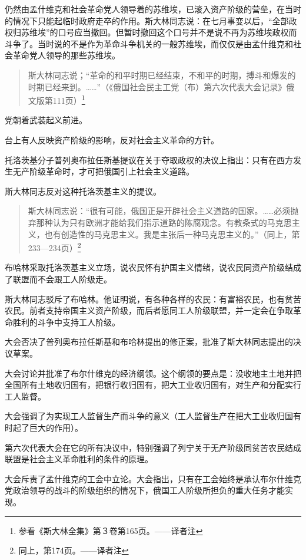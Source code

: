 仍然由孟什维克和社会革命党人领导着的苏维埃，已滚入资产阶级的营垒，在当时的情况下只能起临时政府走卒的作用。斯大林同志说：在七月事变以后，“全部政权归苏维埃”的口号应当撤回。但暂时撤回这个口号并不是说不再为苏维埃政权而斗争了。当时说的不是作为革命斗争机关的一般苏维埃，而仅仅是由孟什维克和社会革命党人领导的那些苏维埃。

\begin{quotation}
斯大林同志说；“革命的和平时期已经结束，不和平的时期，搏斗和爆发的时期已经来到。……”（《俄国社会民主工党（布）第六次代表大会记录》俄文版第111页）\footnote{参看《斯大林全集》第３卷第165页。——译者注}
\end{quotation}

党朝着武装起义前进。

台上有人反映资产阶级的影响，反对社会主义革命的方针。

托洛茨基分子普列奥布拉任斯基提议在关于夺取政权的决议上指出：只有在西方发生无产阶级革命时，才可把俄国引上社会主义道路。

斯大林同志反对这种托洛茨基主义的提议。

\begin{quotation}
斯大林同志说：“很有可能，俄国正是开辟社会主义道路的国家。……必须抛弃那种认为只有欧洲才能给我们指示道路的陈腐观念。有教条式的马克思主义，也有创造性的马克思主义。我是主张后一种马克思主义的。”（同上，第233—234页）\footnote{同上，第174页。——译者注}
\end{quotation}

布哈林采取托洛茨基主义立场，说农民怀有护国主义情绪，说农民同资产阶级结成了联盟而不会跟工人阶级走。

斯大林同志驳斥了布哈林。他证明说，有各种各样的农民：有富裕农民，也有贫苦农民。前者支持帝国主义资产阶级，而后者愿同工人阶级联盟，并一定会在争取革命胜利的斗争中支持工人阶级。

大会否决了普列奥布拉任斯基和布哈林提出的修正案，批准了斯大林同志提出的决议草案。

大会讨论并批准了布尔什维克的经济纲领。这个纲领的要点是：没收地主土地并把全国所有土地收归国有，把银行收归国有，把大工业收归国有，对生产和分配实行工人监督。

大会强调了为实现工人监督生产而斗争的意义（工人监督生产在把大工业收归国有时起了巨大的作用）。

第六次代表大会在它的所有决议中，特别强调了列宁关于无产阶级同贫苦农民结成联盟是社会主义革命胜利的条件的原理。

大会斥责了孟什维克的工会中立论。大会指出，只有在工会始终是承认布尔什维克党政治领导的战斗的阶级组织的情况下，俄国工人阶级所担负的重大任务才能实现。

